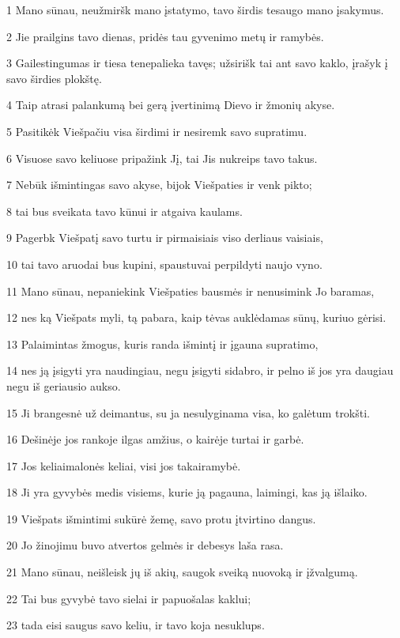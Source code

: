 \par 1 Mano sūnau, neužmiršk mano įstatymo, tavo širdis tesaugo mano įsakymus. 
\par 2 Jie prailgins tavo dienas, pridės tau gyvenimo metų ir ramybės. 
\par 3 Gailestingumas ir tiesa tenepalieka tavęs; užsirišk tai ant savo kaklo, įrašyk į savo širdies plokštę. 
\par 4 Taip atrasi palankumą bei gerą įvertinimą Dievo ir žmonių akyse. 
\par 5 Pasitikėk Viešpačiu visa širdimi ir nesiremk savo supratimu. 
\par 6 Visuose savo keliuose pripažink Jį, tai Jis nukreips tavo takus. 
\par 7 Nebūk išmintingas savo akyse, bijok Viešpaties ir venk pikto; 
\par 8 tai bus sveikata tavo kūnui ir atgaiva kaulams. 
\par 9 Pagerbk Viešpatį savo turtu ir pirmaisiais viso derliaus vaisiais, 
\par 10 tai tavo aruodai bus kupini, spaustuvai perpildyti naujo vyno. 
\par 11 Mano sūnau, nepaniekink Viešpaties bausmės ir nenusimink Jo baramas, 
\par 12 nes ką Viešpats myli, tą pabara, kaip tėvas auklėdamas sūnų, kuriuo gėrisi. 
\par 13 Palaimintas žmogus, kuris randa išmintį ir įgauna supratimo, 
\par 14 nes ją įsigyti yra naudingiau, negu įsigyti sidabro, ir pelno iš jos yra daugiau negu iš geriausio aukso. 
\par 15 Ji brangesnė už deimantus, su ja nesulyginama visa, ko galėtum trokšti. 
\par 16 Dešinėje jos rankoje ilgas amžius, o kairėje turtai ir garbė. 
\par 17 Jos keliai­malonės keliai, visi jos takai­ramybė. 
\par 18 Ji yra gyvybės medis visiems, kurie ją pagauna, laimingi, kas ją išlaiko. 
\par 19 Viešpats išmintimi sukūrė žemę, savo protu įtvirtino dangus. 
\par 20 Jo žinojimu buvo atvertos gelmės ir debesys laša rasa. 
\par 21 Mano sūnau, neišleisk jų iš akių, saugok sveiką nuovoką ir įžvalgumą. 
\par 22 Tai bus gyvybė tavo sielai ir papuošalas kaklui; 
\par 23 tada eisi saugus savo keliu, ir tavo koja nesuklups. 
